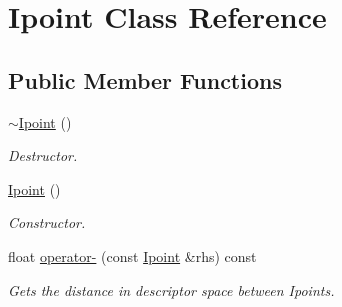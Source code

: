 \hypertarget{classIpoint}{\section{Ipoint Class Reference}
\label{classIpoint}
}
\subsection*{Public Member Functions}
\begin{DoxyCompactItemize}
\item 
\hypertarget{classIpoint_a5432e81d5b6f738fe1691709e9c52338}{\hyperlink{classIpoint_a5432e81d5b6f738fe1691709e9c52338}{$\sim$\-Ipoint} ()}\label{classIpoint_a5432e81d5b6f738fe1691709e9c52338}

\begin{DoxyCompactList}\small\item\em Destructor. \end{DoxyCompactList}\item 
\hypertarget{classIpoint_aefa172d6444692467e2b52beb5482a52}{\hyperlink{classIpoint_aefa172d6444692467e2b52beb5482a52}{Ipoint} ()}\label{classIpoint_aefa172d6444692467e2b52beb5482a52}

\begin{DoxyCompactList}\small\item\em Constructor. \end{DoxyCompactList}\item 
\hypertarget{classIpoint_a01757f800b681e7bcb659aaf1d95d62a}{float \hyperlink{classIpoint_a01757f800b681e7bcb659aaf1d95d62a}{operator-\/} (const \hyperlink{classIpoint}{Ipoint} \&rhs) const }\label{classIpoint_a01757f800b681e7bcb659aaf1d95d62a}

\begin{DoxyCompactList}\small\item\em Gets the distance in descriptor space between Ipoints. \end{DoxyCompactList}\end{DoxyCompactItemize}
